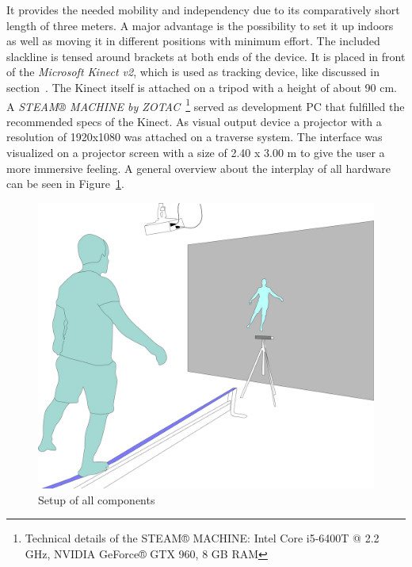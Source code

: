 It provides the needed mobility and independency due to its comparatively short length of three meters.
A major advantage is the possibility to set it up indoors as well as moving it in different positions with minimum effort.
The included slackline is tensed around brackets at both ends of the device.
It is placed in front of the \textit{Microsoft Kinect v2}, which is used as tracking device, like discussed in section~\textit{}.
The Kinect itself is attached on a tripod with a height of about 90 cm.
A \textit{STEAM® MACHINE by ZOTAC}~\footnote{Technical details of the STEAM® MACHINE: Intel Core i5-6400T @ 2.2 GHz, NVIDIA GeForce® GTX 960, 8 GB RAM} served as development PC that fulfilled the recommended specs of the Kinect.
As visual output device a projector with a resolution of 1920x1080 was attached on a traverse system.
The interface was visualized on a projector screen with a size of 2.40 x 3.00 m to give the user a more immersive feeling. A general overview about the interplay of all hardware can be seen in Figure~\ref{fig:5_3_systemArchitecture}.

\begin{figure}[htb]
	\centering
	\begin{minipage}[t]{0.58\linewidth}
		\centering
		\includegraphics[width=1\linewidth]{Pictures/5_1_slackliner}
		\caption{Setup of all components}
		\label{fig:5_3_systemArchitecture}
	\end{minipage}
\end{figure}

